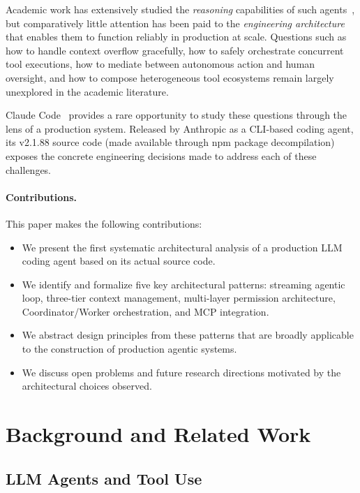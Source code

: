 \documentclass{article}
\begin{document}
Academic work has extensively studied the \emph{reasoning} capabilities of such agents~\cite{wei2022chain,yao2022react,park2023generative}, but comparatively little attention has been paid to the \emph{engineering architecture} that enables them to function reliably in production at scale. Questions such as how to handle context overflow gracefully, how to safely orchestrate concurrent tool executions, how to mediate between autonomous action and human oversight, and how to compose heterogeneous tool ecosystems remain largely unexplored in the academic literature.

Claude Code~\cite{anthropic2024claudecode} provides a rare opportunity to study these questions through the lens of a production system. Released by Anthropic as a CLI-based coding agent, its v2.1.88 source code (made available through npm package decompilation) exposes the concrete engineering decisions made to address each of these challenges.

\paragraph{Contributions.} This paper makes the following contributions:
\begin{itemize}
  \item We present the first systematic architectural analysis of a production LLM coding agent based on its actual source code.
  \item We identify and formalize five key architectural patterns: streaming agentic loop, three-tier context management, multi-layer permission architecture, Coordinator/Worker orchestration, and MCP integration.
  \item We abstract design principles from these patterns that are broadly applicable to the construction of production agentic systems.
  \item We discuss open problems and future research directions motivated by the architectural choices observed.
\end{itemize}

\section{Background and Related Work}

\subsection{LLM Agents and Tool Use}
\end{document}

